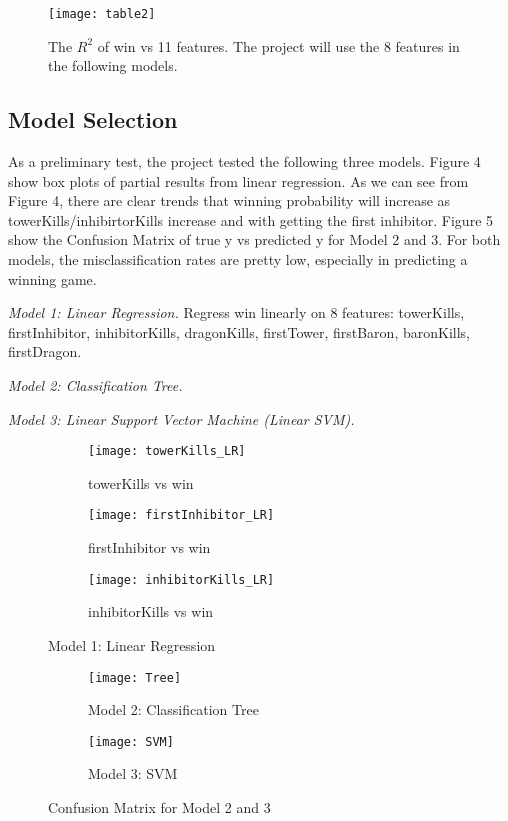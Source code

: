 \documentclass[10.5pt]{article}
\begin{document}
\begin{figure}[h]
\centering
\texttt{[image: table2]}
\caption{The $R^2$ of win vs 11 features. The project will use the 8 features in the following models.}
\end{figure}

\subsection{Model Selection}
As a preliminary test, the project tested the following three models. Figure 4 show box plots of partial results from linear regression. As we can see from Figure 4, there are clear trends that winning probability will increase as towerKills/inhibirtorKills increase and with getting the first inhibitor. Figure 5 show the Confusion Matrix of true y vs predicted y for Model 2 and 3. For both models, the misclassification rates are pretty low, especially in predicting a winning game.

\textendash \textit{Model 1: Linear Regression.} Regress win linearly on 8 features: towerKills, firstInhibitor, inhibitorKills, dragonKills, firstTower, firstBaron, baronKills, firstDragon. 

\textendash \textit{Model 2: Classification Tree.}

\textendash \textit{Model 3: Linear Support Vector Machine (Linear SVM).}


\begin{figure}[h]
    \centering
    \begin{subfigure}[b]{0.32\textwidth}
        \texttt{[image: towerKills\_LR]}
        \caption{towerKills vs win}
    \end{subfigure}
    \begin{subfigure}[b]{0.32\textwidth}
        \texttt{[image: firstInhibitor\_LR]}
        \caption{firstInhibitor vs win}
    \end{subfigure}
    \begin{subfigure}[b]{0.32\textwidth}
        \texttt{[image: inhibitorKills\_LR]}
        \caption{inhibitorKills vs win}
    \end{subfigure}
    \caption{Model 1: Linear Regression}
\end{figure}

\begin{figure}[h]
    \centering
    \begin{subfigure}[b]{0.4\textwidth}
        \texttt{[image: Tree]}
        \caption{Model 2: Classification Tree}
    \end{subfigure}
    \begin{subfigure}[b]{0.4\textwidth}
        \texttt{[image: SVM]}
        \caption{Model 3: SVM}
    \end{subfigure}
    \caption{Confusion Matrix for Model 2 and 3}
\end{figure}
\end{document}
